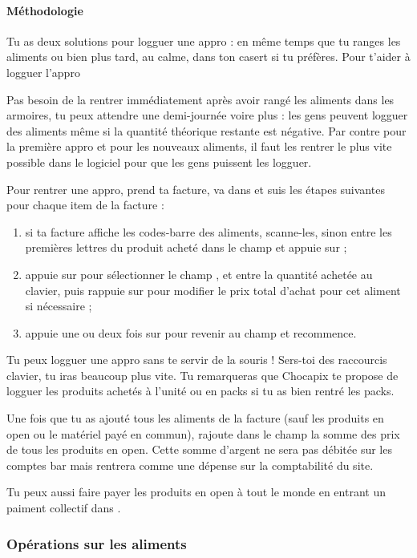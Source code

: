 \documentclass[12pt,french]{article}
\begin{document}
\paragraph{Méthodologie} Tu as deux solutions pour logguer une appro : en même temps que tu ranges les aliments ou bien plus tard, au calme, dans ton casert si tu préfères. Pour t'aider à logguer l'appro

Pas besoin de la rentrer immédiatement après avoir rangé les aliments dans les armoires, tu peux attendre une demi-journée voire plus : les gens peuvent logguer des aliments même si la quantité théorique restante est négative. Par contre pour la première appro et pour les nouveaux aliments, il faut les rentrer le plus vite possible dans le logiciel pour que les gens puissent les logguer.

Pour rentrer une appro, prend ta facture, va dans  et suis les étapes suivantes pour chaque item de la facture :
\begin{enumerate}
	\item si ta facture affiche les codes-barre des aliments, scanne-les, sinon entre les premières lettres du produit acheté dans le champ  et appuie sur  ;
	\item appuie sur  pour sélectionner le champ , et entre la quantité achetée au clavier, puis rappuie sur  pour modifier le prix total d'achat pour cet aliment si nécessaire ;
	\item appuie une ou deux fois sur  pour revenir au champ  et recommence.
\end{enumerate}
Tu peux logguer une appro sans te servir de la souris ! Sers-toi des raccourcis clavier, tu iras beaucoup plus vite. Tu remarqueras que Chocapix te propose de logguer les produits achetés à l'unité ou en packs si tu as bien rentré les packs.

Une fois que tu as ajouté tous les aliments de la facture (sauf les produits en open ou le matériel payé en commun), rajoute dans le champ  la somme des prix de tous les produits en open. Cette somme d'argent ne sera pas débitée sur les comptes bar mais rentrera comme une dépense sur la comptabilité du site.

Tu peux aussi faire payer les produits en open à tout le monde en entrant un paiment collectif dans .

\subsubsection{Opérations sur les aliments}
\end{document}
